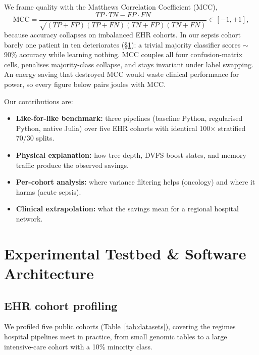 \documentclass[11pt,a4paper]{article}
\begin{document}
We frame quality with the Matthews Correlation Coefficient (MCC),
\begin{equation}
\text{MCC}=\frac{TP\cdot TN-FP\cdot FN}
{\sqrt{(TP{+}FP)(TP{+}FN)(TN{+}FP)(TN{+}FN)}}\in[-1,+1],
\label{eq:mcc}
\end{equation}
because accuracy collapses on imbalanced EHR cohorts. In our sepsis cohort
barely one patient in ten deteriorates (\S\ref{sec:testbed}): a trivial
majority classifier scores $\sim$90\% accuracy while learning nothing. MCC
couples all four confusion-matrix cells, penalises majority-class collapse,
and stays invariant under label swapping. An energy saving that destroyed MCC
would waste clinical performance for power, so every figure below pairs joules
with MCC.

Our contributions are:
\begin{itemize}
\item \textbf{Like-for-like benchmark:} three pipelines (baseline Python, regularised Python, native Julia) over five EHR cohorts with identical 100$\times$ stratified 70/30 splits.
\item \textbf{Physical explanation:} how tree depth, DVFS boost states, and memory traffic produce the observed savings.
\item \textbf{Per-cohort analysis:} where variance filtering helps (oncology) and where it harms (acute sepsis).
\item \textbf{Clinical extrapolation:} what the savings mean for a regional hospital network.
\end{itemize}

\section{Experimental Testbed \& Software Architecture}
\label{sec:testbed}
\subsection{EHR cohort profiling}
We profiled five public cohorts (Table~\ref{tab:datasets}), covering the
regimes hospital pipelines meet in practice, from small genomic tables to a
large intensive-care cohort with a 10\% minority class.
\end{document}
